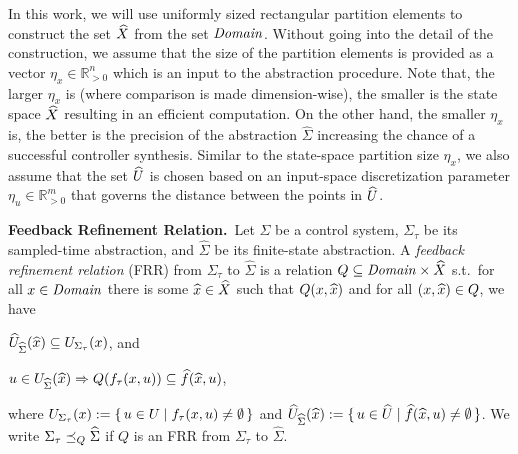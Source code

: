 In this work, we will use uniformly sized rectangular partition elements to construct the set $\widehat{X}$ from the set $\mathit{Domain}$.
Without going into the detail of the construction, we assume that the size of the partition elements is provided as a vector $\eta_x\in \mathbb{R}^n_{>0}$ which is an input to the abstraction procedure.
Note that, the larger $\eta_x$ is (where comparison is made dimension-wise), the smaller is the state space $\widehat{X}$ resulting in an efficient computation.
On the other hand, the smaller $\eta_x$ is, the better is the precision of the abstraction $\widehat{\Sigma}$ increasing the chance of a successful controller synthesis. Similar to the state-space partition size $\eta_x$, we also assume that the set $\widehat{U}$ is chosen based on an input-space discretization parameter $\eta_u\in \mathbb{R}^m_{>0}$ that governs the distance between the points in $\widehat{U}$.

%

\smallskip
\noindent\textbf{Feedback Refinement Relation.}\
Let $\Sigma$ be a control system, $\Sigma_\tau$ be its sampled-time abstraction, and $\widehat{\Sigma}$ be its finite-state abstraction.
A \emph{feedback refinement relation} (FRR) from $\Sigma_\tau$ to $\widehat{\Sigma}$ 
is a relation $Q\subseteq \mathit{Domain}\times \widehat{X}$ s.t.\ 
for all $x\in \mathit{Domain}$ there is some $\widehat{x}\in \widehat{X}$ such that $Q(x,\widehat{x})$ and
for all $(x,\widehat{x})\in Q$, we have
\begin{inparaenum}[(i)]
	\item $\widehat{U}_{\widehat{\Sigma}}(\widehat{x})\subseteq U_{\Sigma_\tau}(x)$, and 
	\item $u\in U_{\widehat{\Sigma}}(\widehat{x}) \Rightarrow Q(f_\tau(x,u))\subseteq \widehat{f}(\widehat{x},u)$,
\end{inparaenum}
where $U_{\Sigma_\tau}(x):=\set{u\in U \mid f_\tau(x,u)\neq \emptyset}$ and $\widehat{U}_{\widehat{\Sigma}}(\widehat{x}):=\set{u\in \widehat{U}\mid \widehat{f}(\widehat{x},u)\neq \emptyset}$.
We write $\Sigma_\tau \preceq_{Q} \widehat{\Sigma}$ if $Q$ is an FRR from $\Sigma_\tau$ to $\widehat{\Sigma}$.


